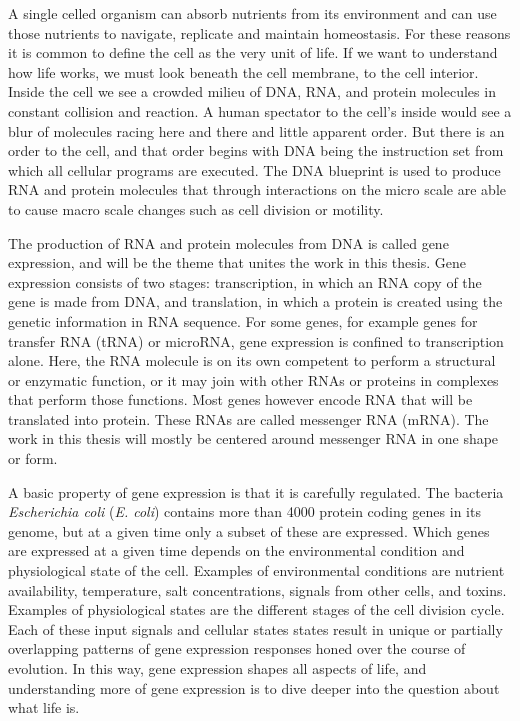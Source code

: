 %
A single celled organism can absorb nutrients from its environment and can use
those nutrients to navigate, replicate and maintain homeostasis. For these
reasons it is common to define the cell as the very unit of life. If we want
to understand how life works, we must look beneath the cell membrane, to the
cell interior. Inside the cell we see a crowded milieu of DNA, RNA, and protein
molecules in constant collision and reaction. A human spectator to the cell's
inside would see a blur of molecules racing here and there and little apparent
order. But there is an order to the cell, and that order begins with DNA being
the instruction set from which all cellular programs are executed. The DNA
blueprint is used to produce RNA and protein molecules that through
interactions on the micro scale are able to cause macro scale changes such as
cell division or motility.

The production of RNA and protein molecules from DNA is called gene expression,
and will be the theme that unites the work in this thesis. Gene expression
consists of two stages: transcription, in which an RNA copy of the gene is made
from DNA, and translation, in which a protein is created using the genetic
information in RNA sequence. For some genes, for example genes for transfer RNA
(tRNA) or microRNA, gene expression is confined to transcription alone. Here,
the RNA molecule is on its own competent to perform a structural or enzymatic
function, or it may join with other RNAs or proteins in complexes that perform
those functions. Most genes however encode RNA that will be translated into
protein. These RNAs are called messenger RNA (mRNA). The work in this thesis
will mostly be centered around messenger RNA in one shape or form.

A basic property of gene expression is that it is carefully regulated. The
bacteria \textit{Escherichia coli} (\textit{E. coli}) contains more than 4000
protein coding genes in its genome, but at a given time only a subset of these
are expressed. Which genes are expressed at a given time depends on the
environmental condition and physiological state of the cell. Examples of
environmental conditions are nutrient availability, temperature, salt
concentrations, signals from other cells, and toxins. Examples of physiological
states are the different stages of the cell division cycle. Each of these input
signals and cellular states states result in unique or partially overlapping
patterns of gene expression responses honed over the course of evolution. In
this way, gene expression shapes all aspects of life, and understanding more of
gene expression is to dive deeper into the question about what life is.

